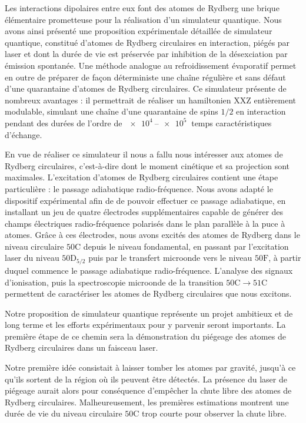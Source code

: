 Les interactions dipolaires entre eux font des atomes de Rydberg une \og brique élémentaire \fg{} prometteuse pour la réalisation d'un simulateur quantique.
Nous avons ainsi présenté une proposition expérimentale détaillée de simulateur quantique, constitué d'atomes de Rydberg circulaires en interaction, piégés par laser et dont la durée de vie est préservée par inhibition de la désexciation par émission spontanée.
Une méthode analogue au refroidissement évaporatif permet en outre de préparer de façon déterministe une chaîne régulière et sans défaut d'une quarantaine d'atomes de Rydberg circulaires.
Ce simulateur présente de nombreux avantages : il permettrait de réaliser un hamiltonien $\mathrm{XXZ}$ entièrement modulable, simulant une chaîne d'une quarantaine de spins $1/2$ en interaction pendant des durées de l'ordre de $\SIrange{e4}{e5}{}$ temps caractéristiques d'échange.

En vue de réaliser ce simulateur il nous a fallu nous intéresser aux atomes de Rydberg circulaires, c'est-à-dire dont le moment cinétique et sa projection sont maximales.
L'excitation d'atomes de Rydberg circulaires contient une étape particulière : le passage adiabatique radio-fréquence.
Nous avons adapté le dispositif expérimental afin de de pouvoir effectuer ce passage adiabatique, en installant un jeu de quatre électrodes supplémentaires capable de générer des champs électriques radio-fréquence polarisés dans le plan parallèle à la puce à atomes.
Grâce à ces électrodes, nous avons excités des atomes de Rydberg dans le niveau circulaire $\mathrm{50C}$ depuis le niveau fondamental, en passant par l'excitation laser du niveau $\mathrm{50D_{5/2}}$ puis par le transfert microonde vers le niveau $\mathrm{50F}$, à partir duquel commence le passage adiabatique radio-fréquence.
L'analyse des signaux d'ionisation, puis la spectroscopie microonde de la transition $\mathrm{50C \rightarrow 51C}$ permettent de caractériser les atomes de Rydberg circulaires que nous excitons.

\bigskip
Notre proposition de simulateur quantique représente un projet ambitieux et de long terme et les efforts expérimentaux pour y parvenir seront importants.
La première étape de ce chemin sera la démonstration du piégeage des atomes de Rydberg circulaires dans un faisceau laser.

Notre première idée consistait à laisser tomber les atomes par gravité, jusqu'à ce qu'ils sortent de la région où ils peuvent être détectés.
La présence du laser de piégeage aurait alors pour conséquence d'empêcher la chute libre des atomes de Rydberg circulaires.
Malheureusement, les premières estimations montrent une durée de vie du niveau circulaire $\mathrm{50C}$ trop courte pour observer la chute libre.


